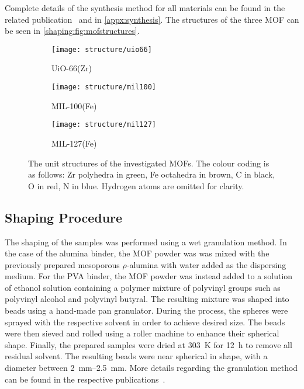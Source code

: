 Complete details of the synthesis method for all materials 
can be found in the related
publication~\cite{valekarShapingPorousMetal2017}
and in \autoref{appx:synthesis}.
The structures of the three \gls{MOF} can be seen
in \autoref{shaping:fig:mofstructures}.

\begin{figure}[htb]
	\centering
	\begin{subfigure}[b]{0.3\textwidth}
		\texttt{[image: structure/uio66]}
		\caption{UiO-66(Zr)}
	\end{subfigure}%
	\begin{subfigure}[b]{0.3\textwidth}
		\texttt{[image: structure/mil100]}
		\caption{MIL-100(Fe)}
	\end{subfigure}%
	\begin{subfigure}[b]{0.3\textwidth}
		\texttt{[image: structure/mil127]}
		\caption{MIL-127(Fe)}
	\end{subfigure}%

	\caption{The unit structures of the investigated \glspl{MOF}.
		The colour coding is as follows: Zr polyhedra in green,
		Fe octahedra in brown, C in black, O in red, N in blue.
		Hydrogen atoms are omitted for clarity.}%
	\label{shaping:fig:mofstructures}
\end{figure}

\subsection{Shaping Procedure}

The shaping of the samples was performed
using a wet granulation method. In the case of the alumina binder,
the \gls{MOF} powder was was mixed with the previously prepared mesoporous
\(\rho\)-alumina with water added as the dispersing medium. For the
\gls{PVA} binder, the \gls{MOF} powder was instead added to a solution of
ethanol solution containing a polymer mixture of polyvinyl groups
such as polyvinyl alcohol and polyvinyl butyral. The resulting
mixture was shaped into beads using a hand-made pan granulator.
During the process, the spheres were sprayed with the respective
solvent in order to achieve desired size. The beads were then sieved
and rolled using a roller machine to enhance their spherical
shape. Finally, the prepared samples were dried at \SI{303}{\kelvin}
for \SI{12}{\hour} to remove all residual solvent.
The resulting beads were near spherical in shape, with a diameter
between \SIrange{2}{2.5}{\milli\metre}. More details regarding the
granulation method can be found in the respective 
publications~\cite{chevreauSynthesisBiocompatibleHighly2016,%
chanutObservingEffectsShaping2016}.

